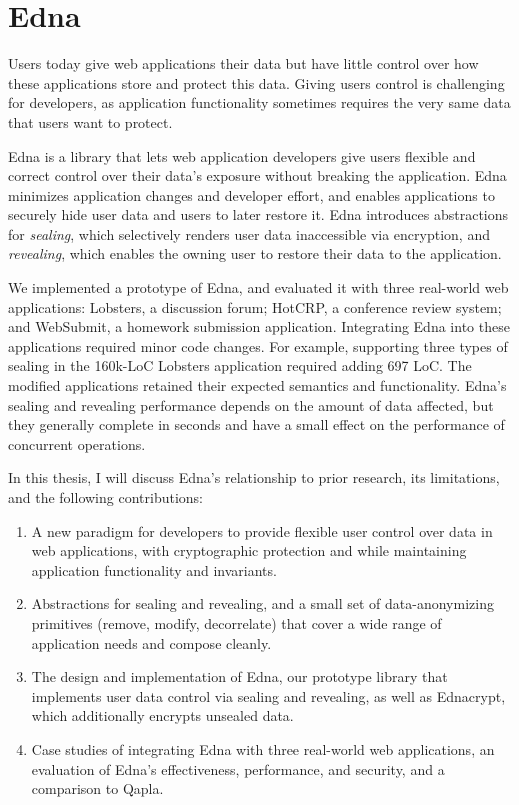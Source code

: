 \begin{comment}
- Papers included in thesis
- Content of papers (objectives/methods/Preliminary results)
\end{comment}

\section{Edna}

Users today give web applications their data but have little control over how
these applications store and protect this data.  Giving users control is
challenging for developers, as application functionality sometimes requires the
very same data that users want to protect.

Edna is a library that lets web application developers give users flexible and
correct control over their data’s exposure without breaking the application.
Edna minimizes application changes and developer effort, and enables
applications to securely hide user data and users to later restore it.  Edna
introduces abstractions for \emph{sealing}, which selectively renders user data
inaccessible via encryption, and \emph{revealing}, which enables the owning
user to restore their data to the application.

We implemented a prototype of Edna, and evaluated it with three real-world web
applications: Lobsters, a discussion forum; HotCRP, a conference review system;
and WebSubmit, a homework submission application. Integrating Edna into these
applications required minor code changes. For example, supporting three types of
sealing in the 160k-LoC Lobsters application required adding 697 LoC. The
modified applications retained their expected semantics and functionality.
Edna's sealing and revealing performance depends on the amount of data affected,
but they generally complete in seconds and have a small effect on the
performance of concurrent operations.

In this thesis, I will discuss Edna's relationship to prior research, its
limitations, and the following contributions:
\begin{enumerate}[nosep] 
    \item A new paradigm for developers to provide flexible user control over data in web applications, with cryptographic protection and while maintaining application functionality and invariants.
    \item Abstractions for sealing and revealing, and a small set of data-anonymizing primitives (remove, modify, decorrelate) that cover a wide range of application needs and compose cleanly.
    \item The design and implementation of Edna, our prototype library that implements user data control via sealing and revealing, as well as Ednacrypt, which additionally encrypts unsealed data.
    \item Case studies of integrating Edna with three real-world web applications, an evaluation of Edna's effectiveness, performance, and security, and a comparison to Qapla.
\end{enumerate}

